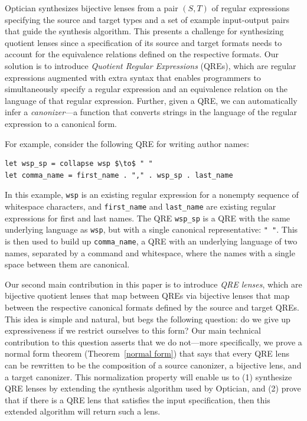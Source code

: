\documentclass[acmsmall,review,anonymous]{acmart}
\begin{document}
Optician synthesizes bijective lenses from a pair $(S, T)$ of regular
expressions
specifying the source and target types and a set of example input-output pairs
that guide the synthesis algorithm. This presents a challenge for synthesizing
quotient lenses since a specification of its source and target formats
needs to account for the equivalence relations defined on the
respective formats. Our solution is to introduce {\em Quotient Regular
Expressions} (QREs), which are regular expressions augmented with extra
syntax that enables programmers to simultaneously specify a regular expression
and an equivalence relation on the language of that regular expression.
Further, given a QRE, we can automatically infer a \emph{canonizer}---a
function that converts strings in the language of the regular expression
to a canonical form.

For example, consider the following QRE for writing author names:
%
\begin{lstlisting}
let wsp_sp = collapse wsp $\to$ " "
let comma_name = first_name . "," . wsp_sp . last_name
\end{lstlisting}
%
In this example, \lstinline{wsp} is an existing regular expression for a
nonempty sequence of whitespace characters, and \lstinline{first_name} and
\lstinline{last_name} are existing regular expressions for first and last names.
The QRE \lstinline{wsp_sp} is a QRE with the same underlying language as
\lstinline{wsp}, but with a single canonical representative: \lstinline{" "}.
This is then used to build up \lstinline{comma_name}, a QRE with an
underlying language of two names, separated by a command and whitespace, where
the names with a single space between them are canonical.

Our second main contribution in this paper is to introduce {\em QRE lenses},
which are bijective quotient lenses that map between QREs via bijective lenses
that map between the respective canonical formats defined by the source and
target QREs. This idea is simple and natural, but begs the following question:
do we give up expressiveness if we restrict ourselves to this form? Our main
technical contribution to this question asserts that we do not---more
specifically, we prove a normal form theorem (Theorem~\ref{normal form})
that says that every QRE lens can be rewritten to be the composition of a
source canonizer, a bijective lens, and a target canonizer. This normalization
property will enable us to (1) synthesize QRE lenses by extending the synthesis
algorithm used by Optician, and (2) prove that if there is a QRE lens that
satisfies the input specification, then this extended algorithm will return
such a lens.
\end{document}
